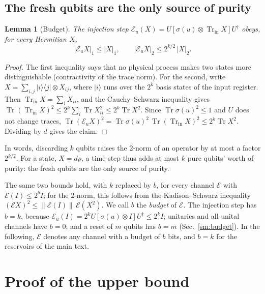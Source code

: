 \documentclass[aps,prl,twocolumn,superscriptaddress,floatfix]{revtex4-2}
\theoremstyle{plain}
\newtheorem{lemma}{Lemma}
\newcommand{\tr}{\operatorname{Tr}}
\newcommand{\ket}[1]{|#1\rangle}
\newcommand{\ketbra}[2]{|#1\rangle\!\langle #2|}
\newcommand{\nrm}[2]{\lvert #1\rvert_{#2}}
\newcommand{\Norm}[1]{\lVert #1\rVert}
\newcommand{\cE}{\mathcal E}
\begin{document}
\subsection{The fresh qubits are the only source of purity}

\begin{lemma}[Budget]\label{lem:norms}
The injection step $\cE_u(X)=U[\sigma(u)\otimes\tr_{\mathrm{in}}X]U^\dagger$ obeys, for every Hermitian $X$,
\begin{equation}
\nrm{\cE_uX}1\le\nrm X1,\qquad\nrm{\cE_uX}2\le2^{k/2}\,\nrm X2 .
\label{eq:S-norms}
\end{equation}
\end{lemma}

\begin{proof}
The first inequality says that no physical process makes two states more distinguishable (contractivity of the trace norm). For the second, write $X=\sum_{i,j}\ketbra ij\otimes X_{ij}$, where $\ket i$ runs over the $2^k$ basis states of the input register. Then $\tr_{\mathrm{in}}X=\sum_iX_{ii}$, and the Cauchy--Schwarz inequality gives $\tr(\tr_{\mathrm{in}}X)^2\le2^k\sum_i\tr X_{ii}^2\le2^k\tr X^2$. Since $\tr\sigma(u)^2\le1$ and $U$ does not change traces, $\tr(\cE_uX)^2=\tr\sigma(u)^2\,\tr(\tr_{\mathrm{in}}X)^2\le2^k\tr X^2$. Dividing by $d$ gives the claim.
\end{proof}

In words, discarding $k$ qubits raises the 2-norm of an operator by at most a factor $2^{k/2}$. For a state, $X=d\rho$, a time step thus adds at most $k$ pure qubits' worth of purity: the fresh qubits are the only source of purity.

The same two bounds hold, with $k$ replaced by $b$, for every channel $\cE$ with $\cE(I)\le2^bI$; for the 2-norm, this follows from the Kadison--Schwarz inequality $(\cE X)^2\le\Norm{\cE(I)}\,\cE(X^2)$. We call $b$ the \emph{budget} of $\cE$. The injection step has $b=k$, because $\cE_u(I)=2^kU[\sigma(u)\otimes I]U^\dagger\le2^kI$; unitaries and all unital channels have $b=0$; and a reset of $m$ qubits has $b=m$ (Sec.~\ref{sm:budget}). In the following, $\cE$ denotes any channel with a budget of $b$ bits, and $b=k$ for the reservoirs of the main text.

\section{Proof of the upper bound}
\label{sm:upper}
\end{document}
